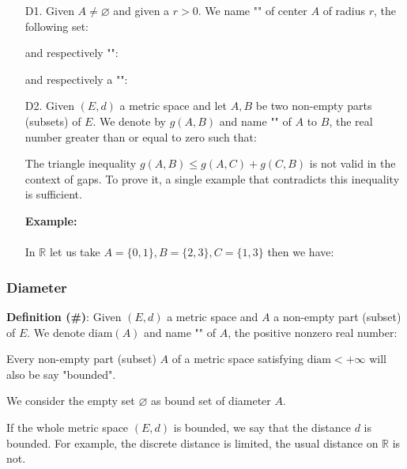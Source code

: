 	\begin{enumerate}
		\item[D1.] Given $A\neq \varnothing$ and given a $r>0$. We name "" of center $A$ of radius $r$, the following set:
		
		and respectively "":
		
		and respectively  a "":
		
		
		\item[D2.] Given $(E, d)$ a metric space and let $A, B$ be two non-empty parts (subsets) of $E$. We denote by $g (A, B)$ and name "" of $A$ to $B$, the real number greater than or equal to zero such that:
		
		\begin{tcolorbox}[title=Remark,colframe=black,arc=10pt]
		The triangle inequality $g(A,B)\leq g(A,C)+g(C,B)$ is not valid in the context of gaps. To prove it, a single example that contradicts this inequality is sufficient.
		\end{tcolorbox}
		\begin{tcolorbox}[colframe=black,colback=white,sharp corners]
		\textbf{{\Large {}}Example:}\\\\
		In $\mathbb{R}$ let us take $A=\{0,1\},B=\{2,3\},C=\{1,3\}$ then we have:
		
		\end{tcolorbox}	
	\end{enumerate}
	
	\subsubsection{Diameter}
	\textbf{Definition (\#\mydef)}: Given $(E, d)$ a metric space and $A$ a non-empty part (subset) of $E$. We denote $\text{diam}(A)$ and name "" of $A$, the positive nonzero real number:
	
	Every non-empty part (subset) $A$ of a metric space satisfying $\text{diam}<+\infty$ will also be say "bounded".
	\begin{tcolorbox}[title=Remark,colframe=black,arc=10pt]
	We consider the empty set $\varnothing$ as bound set of diameter $A$.
	\end{tcolorbox}	
	If the whole metric space $(E,d)$ is bounded, we say that the distance $d$ is bounded. For example, the discrete distance is limited, the usual distance on $\mathbb{R}$ is not.
	
